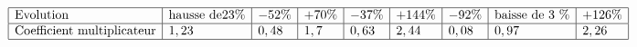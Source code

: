 $$
\begin{array}{|l|l|l|l|l|l|l|l|l|}
\hline \text{Evolution }& \text{hausse de} 23\% & -52\% & +70\% & -37\% & +144\% & -92\% & \text{baisse de 3 \%}& +126\% \\
\hline \text{Coefficient multiplicateur} & 1,23 & 0,48 & 1,7 & 0,63 & 2,44 & 0,08 & 0,97 & 2,26 \\
\hline
\end{array}$$
